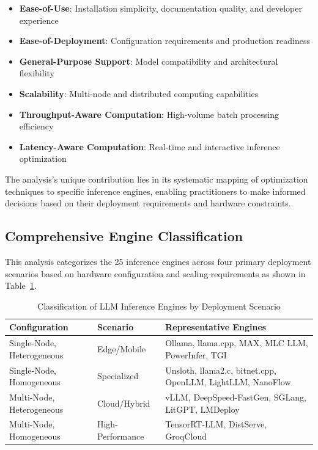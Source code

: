 \documentclass[12pt,a4paper]{article}
\begin{document}
\begin{itemize}
    \item \textbf{Ease-of-Use}: Installation simplicity, documentation quality, and developer experience
    \item \textbf{Ease-of-Deployment}: Configuration requirements and production readiness
    \item \textbf{General-Purpose Support}: Model compatibility and architectural flexibility
    \item \textbf{Scalability}: Multi-node and distributed computing capabilities
    \item \textbf{Throughput-Aware Computation}: High-volume batch processing efficiency
    \item \textbf{Latency-Aware Computation}: Real-time and interactive inference optimization
\end{itemize}

The analysis's unique contribution lies in its systematic mapping of optimization techniques to specific inference engines, enabling practitioners to make informed decisions based on their deployment requirements and hardware constraints.

\subsection{Comprehensive Engine Classification}

This analysis categorizes the 25 inference engines across four primary deployment scenarios based on hardware configuration and scaling requirements as shown in Table~\ref{tab:engine_classification}.

\begin{table}[htbp]
\centering
\caption{Classification of LLM Inference Engines by Deployment Scenario}
\label{tab:engine_classification}
\begin{tabular}{@{}p{4cm}p{4cm}p{8cm}@{}}
\toprule
\textbf{Configuration} & \textbf{Scenario} & \textbf{Representative Engines} \\
\midrule
Single-Node, Heterogeneous & Edge/Mobile & Ollama, llama.cpp, MAX, MLC LLM, PowerInfer, TGI \\
\addlinespace
Single-Node, Homogeneous & Specialized & Unsloth, llama2.c, bitnet.cpp, OpenLLM, LightLLM, NanoFlow \\
\addlinespace
Multi-Node, Heterogeneous & Cloud/Hybrid & vLLM, DeepSpeed-FastGen, SGLang, LitGPT, LMDeploy \\
\addlinespace
Multi-Node, Homogeneous & High-Performance & TensorRT-LLM, DistServe, GroqCloud \\
\bottomrule
\end{tabular}
\end{table}
\end{document}
